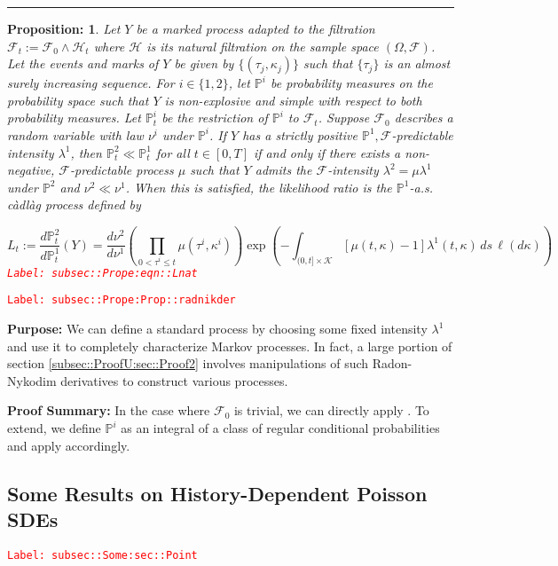 \documentclass[12pt]{article}
\newcommand{\mb}{\mathbb}
\newcommand{\mc}{\mathcal}
\newcommand{\tr}{\textcolor{red}}
\newcommand{\labe}[1]{\tr{\texttt{Label: #1}}}
\newcommand{\purpose}{\textbf{Purpose: }}
\newcommand{\pfsum}{\textbf{Proof Summary: }}
\newcommand{\lin}{\rule{\linewidth}{0.4 pt}}
\newcommand{\pr}{\mb{P}}							%
\newtheorem{prop}[thms]{Proposition: }
\begin{document}
\lin

\begin{prop}
Let \(Y\) be a marked process adapted to the filtration \(\mc{F}_t := \mc{F}_0\wedge \mc{H}_t\) where \(\mc{H}\) is its natural filtration on the sample space \((\Omega,\mc{F})\). Let the events and marks of \(Y\) be given by \(\{(\tau_j,\kappa_j)\}\) such that \(\{\tau_j\}\) is an almost surely increasing sequence. For \(i \in \{1,2\}\), let \(\pr^i\) be probability measures on the probability space such that \(Y\) is non-explosive and simple with respect to both probability measures. Let \(\pr^i_t\) be the restriction of \(\pr^i\) to \(\mc{F}_t\). Suppose \(\mc{F}_0\) describes a random variable with law \(\nu^i\) under \(\pr^i\). If \(Y\) has a strictly positive \(\pr^1,\mc{F}\)-predictable intensity \(\lambda^1\), then \(\pr^2_t \ll \pr^1_t\) for all \(t \in [0,T]\) if and only if there exists a non-negative, \(\mc{F}\)-predictable process \(\mu\) such that \(Y\) admits the \(\mc{F}\)-intensity \(\lambda^2 = \mu\lambda^1\) under \(\pr^2\) and \(\nu^2 \ll \nu^1\). When this is satisfied, the likelihood ratio is the \(\pr^1\)-a.s. c\`adl\`ag process defined by 

\begin{equation}
L_t:= \frac{d\pr^2_t}{d\pr^1_t}(Y) = \frac{d\nu^2}{d\nu^1}\left(\prod_{0<\tau^i\leq t} \mu(\tau^i,\kappa^i)\right)\exp\left(-\int_{(0,t]\times \mc{K}}[\mu(t,\kappa) - 1]\lambda^1(t,\kappa)\,ds\,\ell(d\kappa)\right)
\label{subsec::Prope:eqn::Lnat}
\end{equation}
\labe{subsec::Prope:eqn::Lnat}
\label{subsec::Prope:Prop::radnikder}
\end{prop}
\labe{subsec::Prope:Prop::radnikder}

\purpose We can define a standard process by choosing some fixed intensity \(\lambda^1\) and use it to completely characterize Markov processes. In fact, a large portion of section \ref{subsec::ProofU:sec::Proof2} involves manipulations of such Radon-Nykodim derivatives to construct various processes.

\pfsum In the case where \(\mc{F}_0\) is trivial, we can directly apply \cite[Theorem 14.4.I]{DalVer08}. To extend, we define \(\pr^i\) as an integral of a class of regular conditional probabilities and apply \cite[Theorem 14.4.I]{DalVer08} accordingly.

\subsection{Some Results on History-Dependent Poisson SDEs}
\label{subsec::Some:sec::Point}\labe{subsec::Some:sec::Point}
\end{document}
